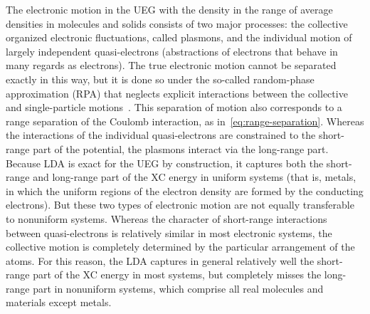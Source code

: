 The electronic motion in the UEG with the density in the range of average densities in molecules and solids consists of two major processes: the collective organized electronic fluctuations, called plasmons, and the individual motion of largely independent quasi-electrons (abstractions of electrons that behave in many regards as electrons).
The true electronic motion cannot be separated exactly in this way, but it is done so under the so-called random-phase approximation (RPA) that neglects explicit interactions between the collective and single-particle motions~\cite{BohmPR51,PinesPR52,BohmPR53}.
This separation of motion also corresponds to a range separation of the Coulomb interaction, as in~\eqref{eq:range-separation}.
Whereas the interactions of the individual quasi-electrons are constrained to the short-range part of the potential, the plasmons interact via the long-range part.
Because LDA is exact for the UEG by construction, it captures both the short-range and long-range part of the XC energy in uniform systems (that is, metals, in which the uniform regions of the electron density are formed by the conducting electrons).
But these two types of electronic motion are not equally transferable to nonuniform systems.
Whereas the character of short-range interactions between quasi-electrons is relatively similar in most electronic systems, the collective motion is completely determined by the particular arrangement of the atoms.
For this reason, the LDA captures in general relatively well the short-range part of the XC energy in most systems, but completely misses the long-range part in nonuniform systems, which comprise all real molecules and materials except metals.


